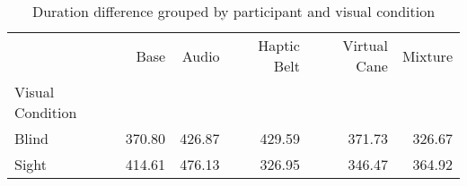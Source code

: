 
\begin{table}[!htb]
\centering
\caption{Duration difference grouped by participant and visual condition}
\label{tab:duracao_average_group}
\begin{tabular}{lrrrrr}
\toprule
{} &    Base &   Audio & Haptic Belt & Virtual Cane & Mixture \\
Visual Condition &         &         &             &              &         \\
\midrule
Blind            &  370.80 &  426.87 &      429.59 &       371.73 &  326.67 \\
Sight            &  414.61 &  476.13 &      326.95 &       346.47 &  364.92 \\
\bottomrule
\end{tabular}
\end{table}


